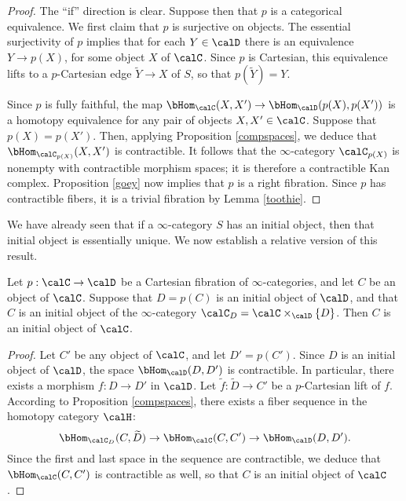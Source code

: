 \begin{proof}
The ``if'' direction is clear. Suppose then that $p$ is a categorical equivalence. We first claim
that $p$ is surjective on objects. The essential surjectivity of $p$ implies that for each $Y \in \calD$ there is an equivalence $Y \rightarrow p(X)$, for some object $X$ of $\calC$. Since $p$ is Cartesian, this equivalence lifts to a $p$-Cartesian edge $\widetilde{Y} \rightarrow X$ of $S$, so that $p(\widetilde{Y}) = Y$.

Since $p$ is fully faithful, the map $\bHom_{\calC}(X,X') \rightarrow \bHom_{\calD}(p(X),p(X'))$ is a homotopy equivalence
for any pair of objects $X,X' \in \calC$. Suppose that $p(X) = p(X')$. Then, applying Proposition \ref{compspaces}, we deduce that $\bHom_{\calC_{p(X)}}(X,X')$ is contractible.
It follows that the $\infty$-category $\calC_{p(X)}$ is nonempty with contractible morphism spaces; it is therefore a contractible Kan complex. Proposition \ref{goey} now implies that $p$ is a right fibration. Since $p$ has contractible fibers, it is a trivial fibration by Lemma \ref{toothie}.
\end{proof}

We have already seen that if a $\infty$-category $S$ has an initial
object, then that initial object is essentially unique. We now establish a relative version of this
result. 


\begin{lemma}\label{sabreto}
Let $p: \calC \rightarrow \calD$ be a Cartesian fibration of $\infty$-categories, and let
$C$ be an object of $\calC$. Suppose that $D = p(C)$ is an initial object of $\calD$, and that
$C$ is an initial object of the $\infty$-category $\calC_{D} = \calC \times_{\calD} \{D\}$. 
Then $C$ is an initial object of $\calC$.
\end{lemma}

\begin{proof}
Let $C'$ be any object of $\calC$, and let $D' = p(C')$. Since $D$ is an initial object of
$\calD$, the space $\bHom_{\calD}(D,D')$ is contractible. In particular, there
exists a morphism $f: D \rightarrow D'$ in $\calD$. Let $\widetilde{f}: \widetilde{D} \rightarrow C'$
be a $p$-Cartesian lift of $f$. According to Proposition \ref{compspaces}, there exists a fiber sequence in the homotopy category $\calH$:
$$ \bHom_{\calC_{D}}(C, \widetilde{D}) \rightarrow \bHom_{\calC}(C,C') \rightarrow
\bHom_{\calD}(D,D').$$
Since the first and last space in the sequence are contractible, we deduce that $\bHom_{\calC}(C,C')$ is contractible as well, so that $C$ is an initial object of $\calC$. 
\end{proof}

